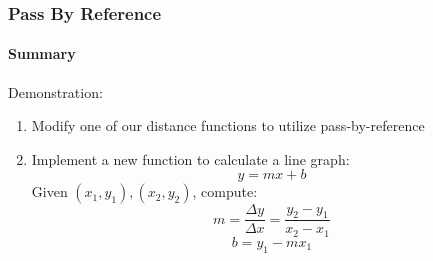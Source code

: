 \documentclass[]{beamer}
\begin{document}
\begin{frame}[fragile]
  \frametitle{Pass By Reference}
  \framesubtitle{Summary}

Demonstration:
\begin{enumerate}
  \item Modify one of our distance functions to utilize pass-by-reference
  \item Implement a new function to calculate a line graph:
    $$y = mx + b$$
  Given $(x_1, y_1), (x_2, y_2)$, compute:
  $$m = \frac{\Delta y}{\Delta x} = \frac{y_2-y_1}{x_2-x_1}$$
  $$b = y_1 - m x_1$$
\end{enumerate}

\end{frame}
\end{document}
